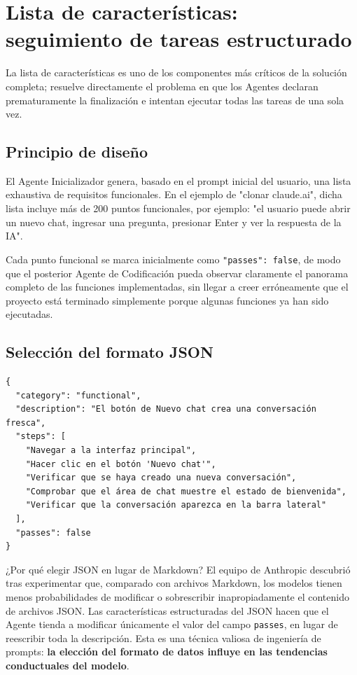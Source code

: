 \section{Lista de características: seguimiento de tareas estructurado}

La lista de características es uno de los componentes más críticos de la solución completa; resuelve directamente el problema en que los Agentes declaran prematuramente la finalización e intentan ejecutar todas las tareas de una sola vez.

\subsection{Principio de diseño}

El Agente Inicializador genera, basado en el prompt inicial del usuario, una lista exhaustiva de requisitos funcionales. En el ejemplo de "clonar claude.ai", dicha lista incluye más de 200 puntos funcionales, por ejemplo: "el usuario puede abrir un nuevo chat, ingresar una pregunta, presionar Enter y ver la respuesta de la IA".

Cada punto funcional se marca inicialmente como \texttt{"passes": false}, de modo que el posterior Agente de Codificación pueda observar claramente el panorama completo de las funciones implementadas, sin llegar a creer erróneamente que el proyecto está terminado simplemente porque algunas funciones ya han sido ejecutadas.

\subsection{Selección del formato JSON}

\begin{lstlisting}[language={}, caption={Estructura JSON de un punto funcional individual dentro de la lista de características}]
{
  "category": "functional",
  "description": "El botón de Nuevo chat crea una conversación fresca",
  "steps": [
    "Navegar a la interfaz principal",
    "Hacer clic en el botón 'Nuevo chat'",
    "Verificar que se haya creado una nueva conversación",
    "Comprobar que el área de chat muestre el estado de bienvenida",
    "Verificar que la conversación aparezca en la barra lateral"
  ],
  "passes": false
}
\end{lstlisting}

\begin{importantbox}{¿Por qué elegir JSON en lugar de Markdown?}
El equipo de Anthropic descubrió tras experimentar que, comparado con archivos Markdown, los modelos tienen menos probabilidades de modificar o sobrescribir inapropiadamente el contenido de archivos JSON. Las características estructuradas del JSON hacen que el Agente tienda a modificar únicamente el valor del campo \texttt{passes}, en lugar de reescribir toda la descripción. Esta es una técnica valiosa de ingeniería de prompts: \textbf{la elección del formato de datos influye en las tendencias conductuales del modelo}.
\end{importantbox}

